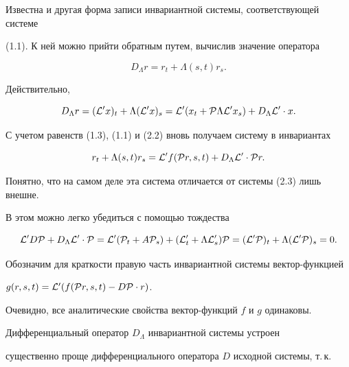 Известна и другая форма записи инвариантной системы, соответствующей системе


(1.1). К ней можно прийти обратным путем, вычислив значение оператора


$$


D_{\Lambda} r=r_t+\Lambda(s,t) r_s.


$$


Действительно,


$$


D_{\Lambda} r=({\cal L}^{\prime} x)_t+\Lambda({\cal L}^{\prime}x)_s =


{\cal L}^{\prime} (x_t+{\cal P} \Lambda{\cal L}^{\prime}x_s) +


D_{\Lambda} {\cal L}^{\prime} \cdot x.


$$


С учетом равенств (1.3), (1.1) и (2.2) вновь получаем систему в инвариантах


$$


r_t+\Lambda(s,t)r_s={\cal L}^{\prime} f({\cal P}r,s,t)+


D_{\Lambda}{\cal L}^{\prime} \cdot {\cal P}r. 


$$


Понятно, что на самом деле эта система отличается от системы (2.3) лишь внешне.


В этом можно легко убедиться с помощью тождества


$$


{\cal L}^{\prime} D {\cal P}+D_{\Lambda} {\cal L}^{\prime} \cdot {\cal P} =


{\cal L}^{\prime} ({\cal P}_t+A{\cal P}_s)+({\cal L}^{\prime}_t +


\Lambda {\cal L}^{\prime}_s){\cal P}=({\cal L}^{\prime} {\cal P})_t+


\Lambda ({\cal L}^{\prime}{\cal P})_s=0.


$$





Обозначим для краткости правую часть инвариантной системы вектор-функцией 


$g(r,s,t)={\cal L}^{\prime} (f({\cal P}r,s,t) - D{\cal P} \cdot r)$.


Очевидно, все аналитические свойства вектор-функций $f$ и $g$ одинаковы.





Дифференциальный оператор $D_{\Lambda}$ инвариантной системы устроен 


существенно проще дифференциального оператора $D$ исходной системы, т.\,к.


